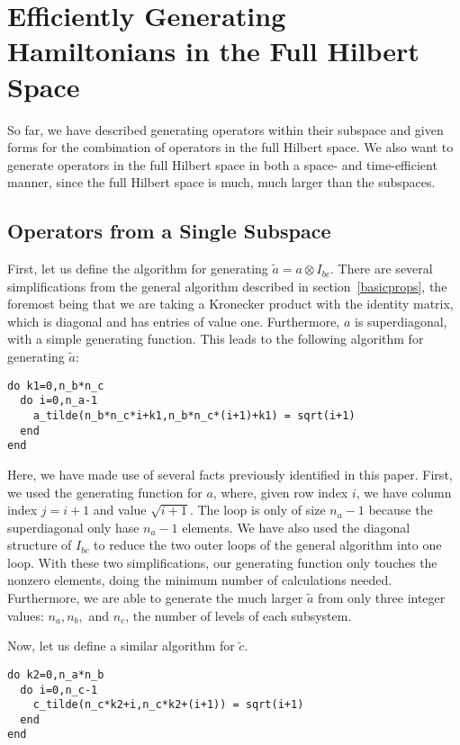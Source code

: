 \documentclass{article}
\begin{document}
\section{Efficiently Generating Hamiltonians in the Full Hilbert Space}\label{generation}
So far, we have described generating operators within their subspace and given forms for the
combination of operators in the full Hilbert space. We also want to generate operators in the
full Hilbert space in both a space- and time-efficient manner, since the full Hilbert space
is much, much larger than the subspaces.

\subsection{Operators from a Single Subspace}
First, let us define the algorithm for generating
$\tilde{a} = a \otimes I_{bc}$.
There are several simplifications from the general algorithm described in section~\ref{basicprops},
the foremost being that we are taking a Kronecker product with the identity matrix, which is
diagonal and has entries of value one. Furthermore, $a$ is superdiagonal, with a simple
generating function. This leads to the following algorithm for generating $\tilde{a}$:

\begin{verbatim}
do k1=0,n_b*n_c
  do i=0,n_a-1
    a_tilde(n_b*n_c*i+k1,n_b*n_c*(i+1)+k1) = sqrt(i+1)
  end
end
\end{verbatim}

Here, we have made use of several facts previously identified in this paper. First, we
used the generating function for $a$, where, given row index $i$, we have column index $j=i+1$ and
value $\sqrt{i+1}$. The loop is only of size $n_a-1$ because the superdiagonal only hase
$n_a-1$ elements. We have also used the diagonal structure of $I_{bc}$ to reduce the
two outer loops of the general algorithm into one loop. With these two simplifications,
our generating function only touches the nonzero elements, doing the minimum number
of calculations needed. Furthermore, we are able to generate the much larger $\tilde{a}$ from
only three integer values: $n_a, n_b,$ and $n_c$, the number of levels of each subsystem.

Now, let us define a similar algorithm for $\tilde{c}$.
\begin{verbatim}
do k2=0,n_a*n_b
  do i=0,n_c-1
    c_tilde(n_c*k2+i,n_c*k2+(i+1)) = sqrt(i+1) 
  end
end
\end{verbatim}
\end{document}
